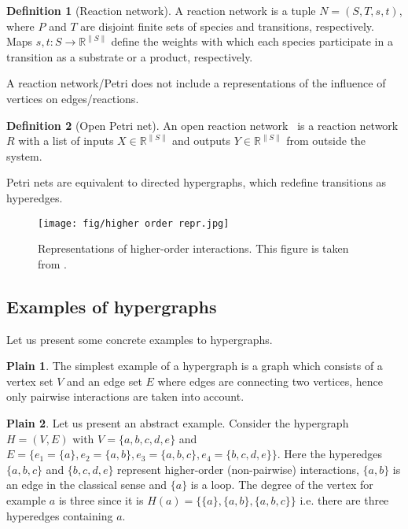 \documentclass[a4paper,12pt]{article}
\theoremstyle{definition}
\newtheorem{definition}{Definition}%
\newtheorem{plain}{Plain}%
\theoremstyle{remark}
\begin{document}
\begin{definition}[Reaction network]
    A reaction network is a tuple $N = ( S , T , s, t )$, where $P$ and $T$ are disjoint finite sets of species and transitions, respectively. Maps $s,t: S \rightarrow \mathbb{R}^{\|S\|}$ define the weights with which each species participate in a transition as a substrate or a product, respectively.
\end{definition}
A reaction network/Petri does not include a representations of the influence of vertices on edges/reactions.

\begin{definition}[Open Petri net]
    An open reaction network~\cite{Baez_open_petri_2017} is a reaction network $R$ with a list of inputs $X \in  \mathbb{R}^{\|S\|}$ and outputs $Y \in  \mathbb{R}^{\|S\|}$ from outside the system.
\end{definition}

Petri nets are equivalent to directed hypergraphs, which redefine transitions as hyperedges. 

\begin{figure}
    \centering
    \texttt{[image: fig/higher order repr.jpg]}
    \caption{Representations of higher-order interactions. This figure is taken from \cite{BATTISTON20201}.}
    \label{highorder}
\end{figure}

\subsection{Examples of hypergraphs}
Let us present some concrete examples to hypergraphs.
\begin{plain}\label{ex21}
The simplest example of a hypergraph is a graph which consists of a vertex set $V$ and an edge set $E$ where edges are connecting two vertices, hence only pairwise interactions are taken into account.
\end{plain}

\begin{plain}\label{ex22}
Let us present an abstract example. Consider the hypergraph $H=(V,E)$ with $V=\{a,b,c,d,e\}$ and $E=\{ e_1 =\{a\},e_2 = \{a,b\},e_3 = \{a,b,c\}, e_4 = \{b,c,d,e\} \}   $. Here the hyperedges $\{a,b,c\}$ and $\{b,c,d,e\}$ represent higher-order (non-pairwise) interactions, $\{a,b\}$ is an edge in the classical sense and $\{a\}$ is a loop. The degree of the vertex for example $a$ is three since it is $H(a)=\{ \{a\}, \{a,b\}, \{a,b,c\} \} $ i.e. there are three hyperedges containing $a$.
\end{plain}
\end{document}
